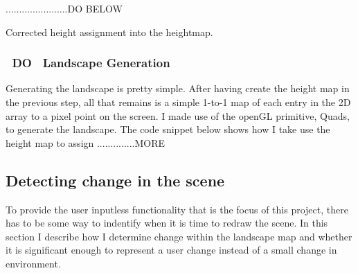 \documentclass[11pt]{article}
\begin{document}
.......................DO BELOW
\begin{algorithm}
\DontPrintSemicolon
{}
\caption{Corrected height assignment into the heightmap.}
\label{algo:assignHeights2}
\end{algorithm}

\subsubsection{~DO~ Landscape Generation}
Generating the landscape is pretty simple. After having create the height map
in the previous step, all that remains is a simple 1-to-1 map of each
entry in the 2D array to a pixel point on the screen. I made use of
the openGL primitive, Quads, to generate the landscape. The code snippet
below shows how I take use the height map to assign ..............MORE


\subsection{Detecting change in the scene}
To provide the user inputless functionality that is the focus of this
project, there has to be some way to indentify when it is time to 
redraw the scene. In this section I describe how I determine change within
the landscape map and whether it is significant enough to represent a 
user change instead of a small change in environment.
\end{document}
